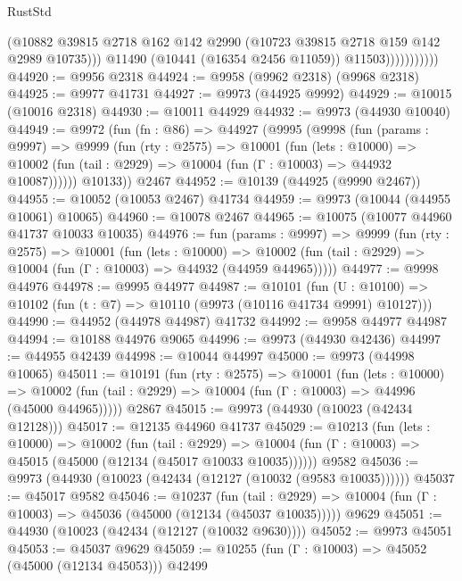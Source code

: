 \begin{lexlean}{RustStd}
\begin{coremodule}
                            (@10882
                              @39815
                              @2718
                              @162
                              @142
                              @2990
                              (@10723 @39815 @2718 @159 @142 @2989 @10735)))
                          @11490
                          (@10441 (@16354 @2456 @11059))
                          @11503)))))))))))
@44920 := @9956 @2318
@44924 := @9958 (@9962 @2318) (@9968 @2318)
@44925 := @9977 @41731
@44927 := @9973 (@44925 @9992)
@44929 := @10015 (@10016 @2318)
@44930 := @10011 @44929
@44932 := @9973 (@44930 @10040)
@44949 := @9972
    (fun (fn : @86) =>
    @44927
      (@9995
        (@9998
          (fun (params : @9997) =>
          @9999
            (fun (rty : @2575) =>
            @10001
              (fun (lets : @10000) =>
              @10002 (fun (tail : @2929) => @10004 (fun (Γ : @10003) => @44932 @10087))))))
        @10133))
    @2467
@44952 := @10139 (@44925 (@9990 @2467))
@44955 := @10052 (@10053 @2467) @41734
@44959 := @9973 (@10044 (@44955 @10061) @10065)
@44960 := @10078 @2467
@44965 := @10075 (@10077 @44960 @41737 @10033 @10035)
@44976 := fun (params : @9997) =>
  @9999
    (fun (rty : @2575) =>
    @10001
      (fun (lets : @10000) =>
      @10002 (fun (tail : @2929) => @10004 (fun (Γ : @10003) => @44932 (@44959 @44965)))))
@44977 := @9998 @44976
@44978 := @9995 @44977
@44987 := @10101
    (fun (U : @10100) => @10102 (fun (t : @7) => @10110 (@9973 (@10116 @41734 @9991) @10127)))
@44990 := @44952 (@44978 @44987) @41732
@44992 := @9958 @44977 @44987
@44994 := @10188 @44976 @9065
@44996 := @9973 (@44930 @42436)
@44997 := @44955 @42439
@44998 := @10044 @44997
@45000 := @9973 (@44998 @10065)
@45011 := @10191
    (fun (rty : @2575) =>
    @10001
      (fun (lets : @10000) =>
      @10002 (fun (tail : @2929) => @10004 (fun (Γ : @10003) => @44996 (@45000 @44965)))))
    @2867
@45015 := @9973 (@44930 (@10023 (@42434 @12128)))
@45017 := @12135 @44960 @41737
@45029 := @10213
    (fun (lets : @10000) =>
    @10002
      (fun (tail : @2929) =>
      @10004 (fun (Γ : @10003) => @45015 (@45000 (@12134 (@45017 @10033 @10035))))))
    @9582
@45036 := @9973 (@44930 (@10023 (@42434 (@12127 (@10032 (@9583 @10035))))))
@45037 := @45017 @9582
@45046 := @10237
    (fun (tail : @2929) => @10004 (fun (Γ : @10003) => @45036 (@45000 (@12134 (@45037 @10035)))))
    @9629
@45051 := @44930 (@10023 (@42434 (@12127 (@10032 @9630))))
@45052 := @9973 @45051
@45053 := @45037 @9629
@45059 := @10255 (fun (Γ : @10003) => @45052 (@45000 (@12134 @45053))) @42499

\end{coremodule}
\end{lexlean}
